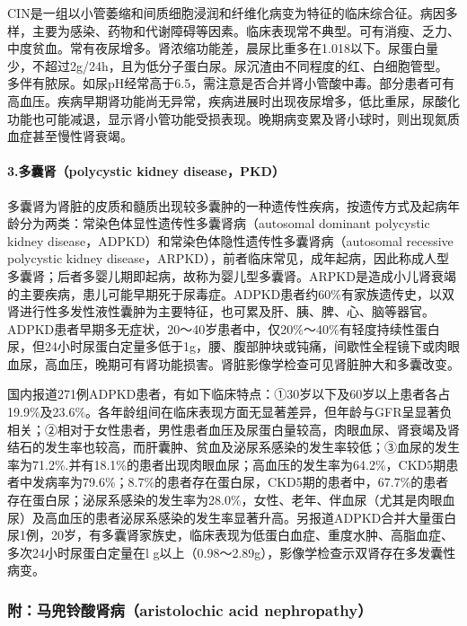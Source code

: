 CIN是一组以小管萎缩和间质细胞浸润和纤维化病变为特征的临床综合征。病因多样，主要为感染、药物和代谢障碍等因素。临床表现常不典型。可有消瘦、乏力、中度贫血。常有夜尿增多。肾浓缩功能差，晨尿比重多在1.018以下。尿蛋白量少，不超过2g/24h，且为低分子蛋白尿。尿沉渣由不同程度的红、白细胞管型。多伴有脓尿。如尿pH经常高于6.5，需注意是否合并肾小管酸中毒。部分患者可有高血压。疾病早期肾功能尚无异常，疾病进展时出现夜尿增多，低比重尿，尿酸化功能也可能减退，显示肾小管功能受损表现。晚期病变累及肾小球时，则出现氮质血症甚至慢性肾衰竭。

\paragraph{3.多囊肾（polycystic kidney disease，PKD）}

多囊肾为肾脏的皮质和髓质出现较多囊肿的一种遗传性疾病，按遗传方式及起病年龄分为两类：常染色体显性遗传性多囊肾病（autosomal
dominant polycystic kidney
disease，ADPKD）和常染色体隐性遗传性多囊肾病（autosomal recessive
polycystic kidney
disease，ARPKD），前者临床常见，成年起病，因此称成人型多囊肾；后者多婴儿期即起病，故称为婴儿型多囊肾。ARPKD是造成小儿肾衰竭的主要疾病，患儿可能早期死于尿毒症。ADPKD患者约60\%有家族遗传史，以双肾进行性多发性液性囊肿为主要特征，也可累及肝、胰、脾、心、脑等器官。ADPKD患者早期多无症状，20～40岁患者中，仅20\%～40\%有轻度持续性蛋白尿，但24小时尿蛋白定量多低于1g，腰、腹部肿块或钝痛，间歇性全程镜下或肉眼血尿，高血压，晚期可有肾功能损害。肾脏影像学检查可见肾脏肿大和多囊改变。

国内报道271例ADPKD患者，有如下临床特点：①30岁以下及60岁以上患者各占19.9\%及23.6\%。各年龄组间在临床表现方面无显著差异，但年龄与GFR呈显著负相关；②相对于女性患者，男性患者血压及尿蛋白量较高，肉眼血尿、肾衰竭及肾结石的发生率也较高，而肝囊肿、贫血及泌尿系感染的发生率较低；③血尿的发生率为71.2\%.并有18.1\%的患者出现肉眼血尿；高血压的发生率为64.2\%，CKD5期患者中发病率为79.6\%；8.7\%的患者存在蛋白尿，CKD5期的患者中，67.7\%的患者存在蛋白尿；泌尿系感染的发生率为28.0\%，女性、老年、伴血尿（尤其是肉眼血尿）及高血压的患者泌尿系感染的发生率显著升高。另报道ADPKD合并大量蛋白尿1例，20岁，有多囊肾家族史，临床表现为低蛋白血症、重度水肿、高脂血症、多次24小时尿蛋白定量在l
g以上（0.98～2.89g），影像学检查示双肾存在多发囊性病变。

\subsubsection{附：马兜铃酸肾病（aristolochic acid nephropathy）}

